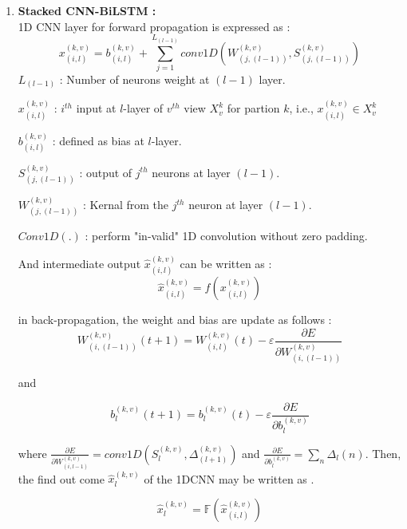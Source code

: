 \documentclass[a4paper, fleqn]{cas-sc}
\theoremstyle{definition}
\theoremstyle{remark}
\begin{document}
\begin{enumerate}[label=(\alph*)]
\item \textbf{Stacked CNN-BiLSTM : } \\
1D CNN layer for forward propagation is expressed as  : 
\begin{equation} \label{1dcnn}
  x_{(i, l)}^{(k, v)}=b_{(i, l)}^{(k, v)} + \sum_{j=1}^{L_{(l-1)}} conv1D \left(W_{(j, (l-1))}^{(k, v)},  S_{(j, (l-1))}^{(k, v)} \right)
\end{equation}
$L_{(l-1)}$ :  Number of neurons weight at $(l-1)$ layer.

$x_{(i, l)}^{(k, v)}$ :  $i^{th}$ input at $l$-layer of $v^{th}$ view $X_v^k$ for partion  $k$,  i.e.,  $x_{(i, l)}^{(k, v)} \in X_v^k$

$b_{(i, l)}^{(k, v)}$ :  defined as bias at $l$-layer.

$S_{(j, (l-1))}^{(k, v)}$ :  output of $j^{th}$ neurons at layer $(l-1)$.

$W_{(j, (l-1))}^{(k, v)}$ :  Kernal from the $j^{th}$ neuron at layer $(l-1)$.

$Conv1D (.)$ :  perform "in-valid" 1D convolution without zero padding.

And intermediate output $\hat{x}_{(i, l)}^{(k, v)}$ can be written as \Cref{1dd} :  
\begin{equation} \label{1dd}
  \hat{x}_{(i, l)}^{(k, v)}= f\left( x_{(i, l)}^{(k, v)} \right)
\end{equation}

in back-propagation,  the weight and bias are update as follows : 
\begin{equation} \label{backp}
  W_{(i, (l-1))}^{(k, v)} (t+1) =W_{(i, l)}^{(k, v)}(t)- \varepsilon \frac{\partial E}{\partial W_{(i, (l-1))}^{(k, v)}}
\end{equation}

and 

\begin{equation} \label{bias}
  b_l^{(k, v)} (t+1) = b_l^{(k, v)}(t)- \varepsilon \frac{\partial E}{\partial b_l^{(k, v)}}
\end{equation}

where $\frac{\partial E}{\partial W_{(i, l-1)}^{(k, v)}} =conv1D \left(S_l^{(k, v)},  \Delta_{(l+1)}^{(k, v)} \right)$ and $\frac{\partial E}{\partial b_l^{(k, v)} }=\sum_{n}^{}\Delta_{l} (n)$. 
Then,  the find out come $\hat{x}_l^{(k, v)}$ of the 1DCNN may be written as .

\begin{equation} \label{1dd hat}
  \hat{x}_l^{(k, v)}=\mathbb{F} \left(\hat{x}_{(i, l)}^{(k, v)} \right )
\end{equation}


\end{enumerate}
\end{document}
